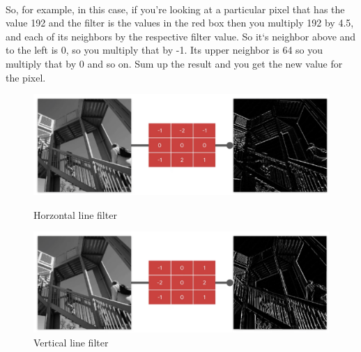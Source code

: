 \documentclass{article}
\begin{document}
    \paragraph{}
    So, for example, in this case, if you're looking at a particular pixel that has the value 192 and the filter is the values in the red box then you multiply 192 by 4.5, and each of its neighbors by the respective filter value. So it`s neighbor above and to the left is 0, so you multiply that by -1. Its upper neighbor is 64 so you multiply that by 0 and so on. Sum up the result and you get the new value for the pixel.
    \begin{figure}
      \centering
      \begin{minipage}{.5\textwidth}
        \centering
        \includegraphics[width=0.9\linewidth]{img/h-line.png}
        \caption{Horzontal line filter}
        \label{fig:test1}
      \end{minipage}%
      \begin{minipage}{.5\textwidth}
        \centering
        \includegraphics[width=0.9\linewidth]{img/v-line.png}
        \caption{Vertical line filter}
        \label{fig:test2}
      \end{minipage}
    \end{figure}
\end{document}
